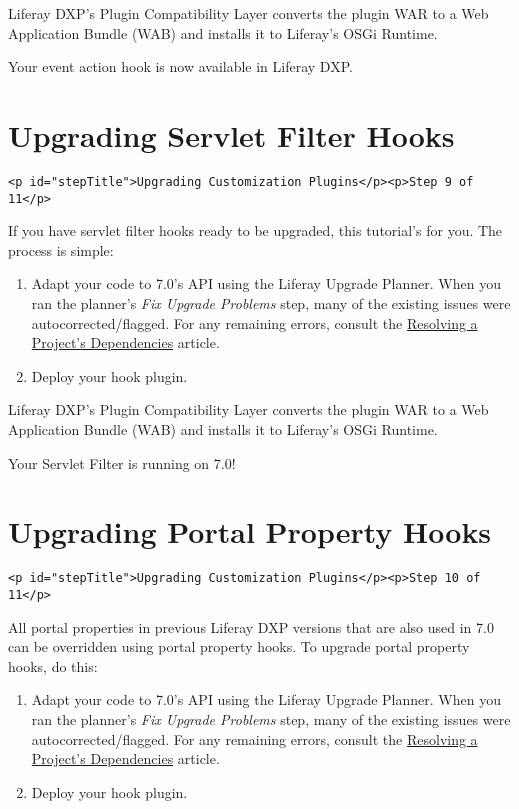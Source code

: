 Liferay DXP's Plugin Compatibility Layer converts the plugin WAR to a
Web Application Bundle (WAB) and installs it to Liferay's OSGi Runtime.

Your event action hook is now available in Liferay DXP.

\chapter{Upgrading Servlet Filter
Hooks}\label{upgrading-servlet-filter-hooks}

\begin{verbatim}
<p id="stepTitle">Upgrading Customization Plugins</p><p>Step 9 of 11</p>
\end{verbatim}

If you have servlet filter hooks ready to be upgraded, this tutorial's
for you. The process is simple:

\begin{enumerate}
\def\labelenumi{\arabic{enumi}.}
\item
  Adapt your code to 7.0's API using the Liferay Upgrade Planner. When
  you ran the planner's \emph{Fix Upgrade Problems} step, many of the
  existing issues were autocorrected/flagged. For any remaining errors,
  consult the
  \href{/docs/7-2/tutorials/-/knowledge_base/t/resolving-a-projects-dependencies}{Resolving
  a Project's Dependencies} article.
\item
  Deploy your hook plugin.
\end{enumerate}

Liferay DXP's Plugin Compatibility Layer converts the plugin WAR to a
Web Application Bundle (WAB) and installs it to Liferay's OSGi Runtime.

Your Servlet Filter is running on 7.0!

\chapter{Upgrading Portal Property
Hooks}\label{upgrading-portal-property-hooks}

\begin{verbatim}
<p id="stepTitle">Upgrading Customization Plugins</p><p>Step 10 of 11</p>
\end{verbatim}

All portal properties in previous Liferay DXP versions that are also
used in 7.0 can be overridden using portal property hooks. To upgrade
portal property hooks, do this:

\begin{enumerate}
\def\labelenumi{\arabic{enumi}.}
\item
  Adapt your code to 7.0's API using the Liferay Upgrade Planner. When
  you ran the planner's \emph{Fix Upgrade Problems} step, many of the
  existing issues were autocorrected/flagged. For any remaining errors,
  consult the
  \href{/docs/7-2/tutorials/-/knowledge_base/t/resolving-a-projects-dependencies}{Resolving
  a Project's Dependencies} article.
\item
  Deploy your hook plugin.
\end{enumerate}

